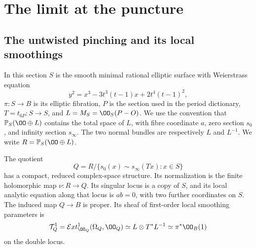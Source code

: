 \section{The limit at the puncture}\label{fam:section:E}
\subsection{The untwisted pinching and its local smoothings}\label{fam:section:E.1}

In this section $S$ is the smooth minimal rational elliptic surface with
Weierstrass equation
\[
 y^2=x^3-3t^3(t-1)x+2t^4(t-1)^2,
\]
$\pi:S\to B$ is its elliptic fibration, $P$ is the section used in the
period dictionary, $T=t_{6P}:S\to S$, and $L=M_S=\OO_S(P-O)$.
We use the convention that $\mathbb P_S(\OO\oplus L)$ contains the total
space of $L$, with fibre coordinate $a$, zero section $s_0$, and infinity
section $s_\infty$. The two normal bundles are respectively $L$ and
$L^{-1}$. We write $R=\mathbb P_S(\OO\oplus L)$.

\begin{proposition}\label{fam:src:E.1.1}\label{fam:st:E.1.1}
The quotient
\[
 Q=R/\{s_0(x)\sim s_\infty(Tx):x\in S\}
\]
has a compact, reduced complex-space structure. Its normalization is
the finite holomorphic map $\nu:R\to Q$. Its singular locus is a copy
of $S$, and its local analytic equation along that locus is $ab=0$,
with two further coordinates on $S$. The induced map $Q\to B$ is
proper. Its sheaf of first-order local smoothing parameters is
\[
 \mathcal T^1_Q=\mathcal Ext^1_{\OO_Q}(\Omega_Q,\OO_Q)
       \simeq L\otimes T^*L^{-1}\simeq\pi^*\OO_B(1)
\]
on the double locus.
\end{proposition}


